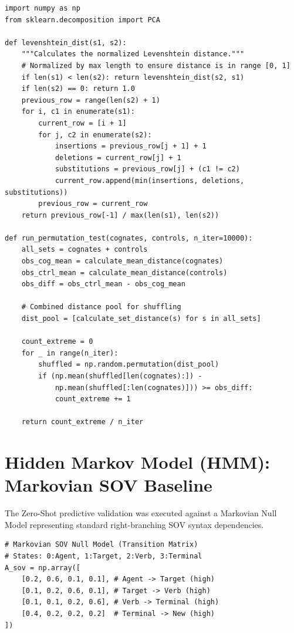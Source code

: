 \documentclass[11pt,oneside,openany]{book}
\begin{document}
\begin{verbatim}
import numpy as np
from sklearn.decomposition import PCA

def levenshtein_dist(s1, s2):
    """Calculates the normalized Levenshtein distance."""
    # Normalized by max length to ensure distance is in range [0, 1]
    if len(s1) < len(s2): return levenshtein_dist(s2, s1)
    if len(s2) == 0: return 1.0
    previous_row = range(len(s2) + 1)
    for i, c1 in enumerate(s1):
        current_row = [i + 1]
        for j, c2 in enumerate(s2):
            insertions = previous_row[j + 1] + 1
            deletions = current_row[j] + 1
            substitutions = previous_row[j] + (c1 != c2)
            current_row.append(min(insertions, deletions, substitutions))
        previous_row = current_row
    return previous_row[-1] / max(len(s1), len(s2))

def run_permutation_test(cognates, controls, n_iter=10000):
    all_sets = cognates + controls
    obs_cog_mean = calculate_mean_distance(cognates)
    obs_ctrl_mean = calculate_mean_distance(controls)
    obs_diff = obs_ctrl_mean - obs_cog_mean
    
    # Combined distance pool for shuffling
    dist_pool = [calculate_set_distance(s) for s in all_sets]
    
    count_extreme = 0
    for _ in range(n_iter):
        shuffled = np.random.permutation(dist_pool)
        if (np.mean(shuffled[len(cognates):]) - 
            np.mean(shuffled[:len(cognates)])) >= obs_diff:
            count_extreme += 1
            
    return count_extreme / n_iter
\end{verbatim}

\section{Hidden Markov Model (HMM): Markovian SOV Baseline}
The Zero-Shot predictive validation was executed against a Markovian Null Model representing standard right-branching SOV syntax dependencies.

\begin{verbatim}
# Markovian SOV Null Model (Transition Matrix)
# States: 0:Agent, 1:Target, 2:Verb, 3:Terminal
A_sov = np.array([
    [0.2, 0.6, 0.1, 0.1], # Agent -> Target (high)
    [0.1, 0.2, 0.6, 0.1], # Target -> Verb (high)
    [0.1, 0.1, 0.2, 0.6], # Verb -> Terminal (high)
    [0.4, 0.2, 0.2, 0.2]  # Terminal -> New (high)
])
\end{verbatim}
\end{document}
